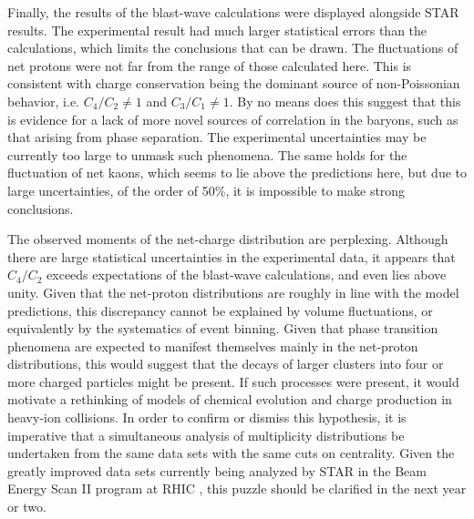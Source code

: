 Finally, the results of the blast-wave calculations were displayed alongside STAR results. The experimental result had much larger statistical errors than the calculations, which limits the conclusions that can be drawn. The fluctuations of net protons were not far from the range of those calculated here. This is consistent with charge conservation being the dominant source of non-Poissonian behavior, i.e. $C_4/C_2\ne 1$ and $C_3/C_1\ne 1$. By no means does this suggest that this is evidence for a lack of more novel sources of correlation in the baryons, such as that arising from phase separation. The experimental uncertainties may be  currently too large to unmask such phenomena. The same holds for the fluctuation of net kaons, which seems to lie above the predictions here, but due to large uncertainties, of the order of 50\%, it is impossible to make strong conclusions.

The observed moments of the net-charge distribution are perplexing. Although there are large statistical uncertainties in the experimental data, it appears that $C_4/C_2$ exceeds expectations of the blast-wave calculations, and even lies above unity. Given that the net-proton distributions are roughly in line with the model predictions, this discrepancy cannot be explained by volume fluctuations, or equivalently by the systematics of event binning. Given that phase transition phenomena are expected to manifest themselves mainly in the net-proton distributions, this would suggest that the decays of larger clusters into four or more charged particles might be present. If such processes were present, it would motivate a rethinking of models of chemical evolution and charge production in heavy-ion collisions. In order to confirm or dismiss this hypothesis, it is imperative that a simultaneous analysis of multiplicity distributions be undertaken from the same data sets with the same cuts on centrality. Given the greatly improved data sets currently being analyzed by STAR in the Beam Energy Scan II program at RHIC \cite{Yang:2017llt}, this puzzle should be clarified in the next year or two.

